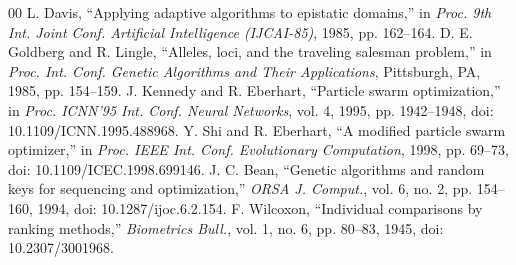 \documentclass[conference]{IEEEtran}
\begin{document}
\begin{thebibliography}{00}
 L. Davis, ``Applying adaptive algorithms to epistatic domains,'' in \textit{Proc. 9th Int. Joint Conf. Artificial Intelligence (IJCAI-85)}, 1985, pp. 162--164.
 D. E. Goldberg and R. Lingle, ``Alleles, loci, and the traveling salesman problem,'' in \textit{Proc. Int. Conf. Genetic Algorithms and Their Applications}, Pittsburgh, PA, 1985, pp. 154--159.
 J. Kennedy and R. Eberhart, ``Particle swarm optimization,'' in \textit{Proc. ICNN'95 Int. Conf. Neural Networks}, vol. 4, 1995, pp. 1942--1948, doi: 10.1109/ICNN.1995.488968.
 Y. Shi and R. Eberhart, ``A modified particle swarm optimizer,'' in \textit{Proc. IEEE Int. Conf. Evolutionary Computation}, 1998, pp. 69--73, doi: 10.1109/ICEC.1998.699146.
 J. C. Bean, ``Genetic algorithms and random keys for sequencing and optimization,'' \textit{ORSA J. Comput.}, vol. 6, no. 2, pp. 154--160, 1994, doi: 10.1287/ijoc.6.2.154.
 F. Wilcoxon, ``Individual comparisons by ranking methods,'' \textit{Biometrics Bull.}, vol. 1, no. 6, pp. 80--83, 1945, doi: 10.2307/3001968.
\end{thebibliography}
\end{document}
